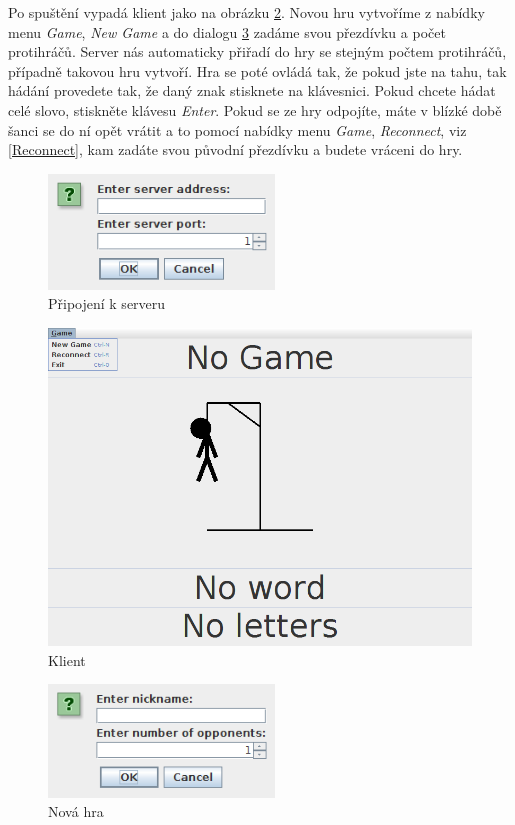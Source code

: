\documentclass[12pt, a4paper]{article}
\begin{document}
	Po spuštění vypadá klient jako na obrázku \ref{Klient}. Novou hru vytvoříme z nabídky menu \emph{Game}, \emph{New Game} a do dialogu \ref{NewGame} zadáme svou přezdívku a počet protihráčů. Server nás automaticky přiřadí do hry se stejným počtem protihráčů, případně takovou hru vytvoří. Hra se poté ovládá tak, že pokud jste na tahu, tak hádání provedete tak, že daný znak stisknete na klávesnici. Pokud chcete hádat celé slovo, stiskněte klávesu \emph{Enter}. Pokud se ze hry odpojíte, máte v blízké době šanci se do ní opět vrátit a to pomocí nabídky menu \emph{Game}, \emph{Reconnect}, viz \ref{Reconnect}, kam zadáte svou původní přezdívku a budete vráceni do hry.
	\begin{figure}[ht!]
		\centering
		\caption{Připojení k serveru}
		\label{Input}
		\includegraphics[width=6cm]{img/Input.png}
	\end{figure}
	\begin{figure}[ht!]
		\centering
		\caption{Klient}
		\label{Klient}
		\includegraphics[width=13cm]{img/Client.png}
	\end{figure}
	\begin{figure}[ht!]
		\centering
		\caption{Nová hra}
		\label{NewGame}
		\includegraphics[width=6cm]{img/NewGame.png}
	\end{figure}
\end{document}
